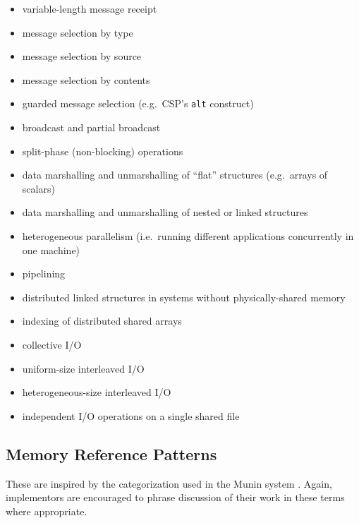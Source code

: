 \begin{itemize}
\item	variable-length message receipt
\item	message selection by type
\item	message selection by source
\item	message selection by contents
\item	guarded message selection (e.g.\ CSP's {\tt{alt}} construct)
\item	broadcast and partial broadcast
\item	split-phase (non-blocking) operations
\item	data marshalling and unmarshalling of ``flat'' structures (e.g.\ arrays of scalars)
\item	data marshalling and unmarshalling of nested or linked structures
\item	heterogeneous parallelism (i.e.\ running different applications concurrently in one machine)
\item	pipelining
\item	distributed linked structures in systems without physically-shared memory
\item	indexing of distributed shared arrays
\item	collective I/O
\item	uniform-size interleaved I/O
\item	heterogeneous-size interleaved I/O
\item	independent I/O operations on a single shared file
\end{itemize}

\subsection{Memory Reference Patterns\label{s:cliche-memref}}

These are inspired by the categorization used in the Munin system \cite{b:munin-overview}.
Again, implementors are encouraged to phrase discussion of their work in these terms where appropriate.

